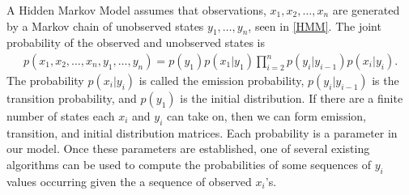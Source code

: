 \documentclass{article}
\numberwithin{equation}{section}
\theoremstyle{definition}
\begin{document}


\noindent A Hidden Markov Model assumes that observations, $x_1,x_2,\dots,x_n$ are generated by a Markov chain of unobserved states $y_1,\dots,y_n$, seen in \autoref{HMM}. The joint probability of the observed and unobserved states is
\begin{align*}
    p(x_1,x_2,\dots,x_n,y_1,\dots,y_n) = p(y_1)p(x_1|y_1) \prod_{i=2}^n p(y_i|y_{i-1})p(x_i|y_i).
\end{align*}
The probability $p(x_i|y_i)$ is called the emission probability, $p(y_{i}|y_{i-1})$ is the transition probability, and $p(y_1)$ is the initial distribution. If there are a finite number of states each $x_i$ and $y_i$ can take on, then we can form emission, transition, and initial distribution matrices. Each probability is a parameter in our model. Once these parameters are established, one of several existing algorithms can be used to compute the  probabilities of some sequences of $y_i$ values occurring given the a sequence of observed $x_i$'s. 
\end{document}

